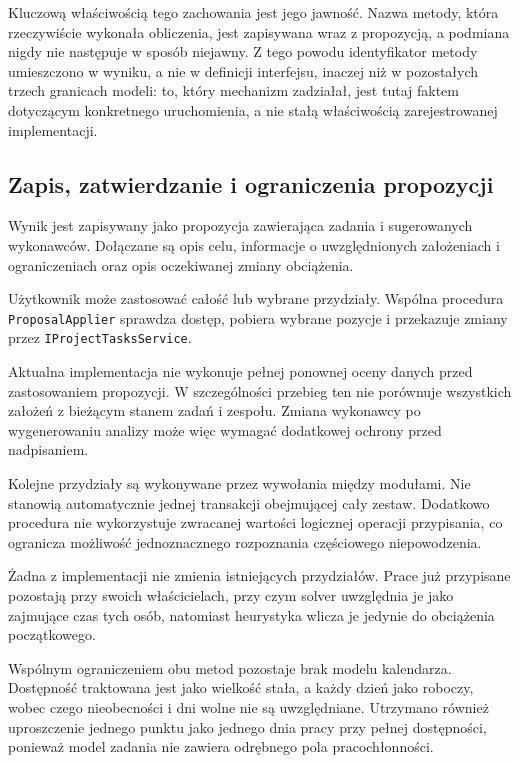 Kluczową właściwością tego zachowania jest jego jawność. Nazwa metody, która rzeczywiście wykonała obliczenia, jest zapisywana wraz z propozycją, a podmiana nigdy nie następuje w sposób niejawny. Z tego powodu identyfikator metody umieszczono w wyniku, a nie w definicji interfejsu, inaczej niż w pozostałych trzech granicach modeli: to, który mechanizm zadziałał, jest tutaj faktem dotyczącym konkretnego uruchomienia, a nie stałą właściwością zarejestrowanej implementacji.

\subsection{Zapis, zatwierdzanie i ograniczenia propozycji}

Wynik jest zapisywany jako propozycja zawierająca zadania i sugerowanych wykonawców. Dołączane są opis celu, informacje o uwzględnionych założeniach i ograniczeniach oraz opis oczekiwanej zmiany obciążenia.

Użytkownik może zastosować całość lub wybrane przydziały. Wspólna procedura \texttt{ProposalApplier} sprawdza dostęp, pobiera wybrane pozycje i przekazuje zmiany przez \texttt{IProjectTasksService}.

Aktualna implementacja nie wykonuje pełnej ponownej oceny danych przed zastosowaniem propozycji. W szczególności przebieg ten nie porównuje wszystkich założeń z bieżącym stanem zadań i zespołu. Zmiana wykonawcy po wygenerowaniu analizy może więc wymagać dodatkowej ochrony przed nadpisaniem.

Kolejne przydziały są wykonywane przez wywołania między modułami. Nie stanowią automatycznie jednej transakcji obejmującej cały zestaw. Dodatkowo procedura nie wykorzystuje zwracanej wartości logicznej operacji przypisania, co ogranicza możliwość jednoznacznego rozpoznania częściowego niepowodzenia.

Żadna z implementacji nie zmienia istniejących przydziałów. Prace już przypisane pozostają przy swoich właścicielach, przy czym solver uwzględnia je jako zajmujące czas tych osób, natomiast heurystyka wlicza je jedynie do obciążenia początkowego.

Wspólnym ograniczeniem obu metod pozostaje brak modelu kalendarza. Dostępność traktowana jest jako wielkość stała, a każdy dzień jako roboczy, wobec czego nieobecności i dni wolne nie są uwzględniane. Utrzymano również uproszczenie jednego punktu jako jednego dnia pracy przy pełnej dostępności, ponieważ model zadania nie zawiera odrębnego pola pracochłonności.

